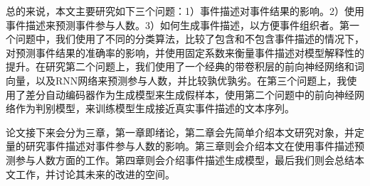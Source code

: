 \documentclass[]{template}
\begin{document}
总的来说，本文主要研究如下三个问题：1）事件描述对事件结果的影响。2）使用事件描述来预测事件参与人数。3）如何生成事件描述，以方便事件组织者。第一个问题中，我们使用了不同的分类算法，比较了包含和不包含事件描述的情况下，对预测事件结果的准确率的影响，并使用固定系数来衡量事件描述对模型解释性的提升。在研究第二个问题上，我们使用了一个经典的带卷积层的前向神经网络和词向量，以及RNN网络来预测参与人数，并比较孰优孰劣。在第三个问题上，我使用了差分自动编码器作为生成模型来生成假样本，使用第二个问题中的前向神经网络作为判别模型，来训练模型生成接近真实事件描述的文本序列。

论文接下来会分为三章，第一章即绪论，第二章会先简单介绍本文研究对象，并定量的研究事件描述对事件参与人数的影响。第三章则会介绍本文在使用事件描述预测参与人数方面的工作。第四章则会介绍事件描述生成模型，最后我们则会总结本文工作，并讨论其未来的改进的空间。
\end{document}
